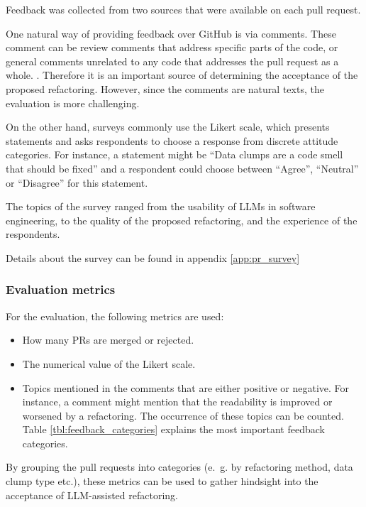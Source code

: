 Feedback was collected from two sources that were available on each pull request. 

One  natural way of providing feedback over GitHub is via comments. These comment can be review comments that address specific parts of the code, or general comments unrelated to any code that addresses the pull request as a whole. \cite{10.1145/3597208}. Therefore it is an important source of determining the acceptance of the proposed refactoring. However, since the comments are natural texts, the evaluation is more challenging.


On the other hand, surveys commonly use the Likert scale, which presents statements and asks respondents to choose a response from discrete attitude categories. \cite{HARPE2015836}
For instance, a statement might be \enquote{Data clumps are a code smell that should be fixed} and a respondent could choose between \enquote{Agree}, \enquote{Neutral} or \enquote{Disagree} for this statement. 


The topics of the survey  ranged from the usability of \acp{LLM} in software engineering, to the quality of the proposed refactoring, and the experience of the respondents. 


Details about the survey can be found in appendix \ref{app:pr_survey}


\subsubsection{Evaluation metrics}

For the evaluation, the following metrics are used:
\begin{itemize}

    \item  How many PRs are merged or rejected.
    \item The numerical value of the Likert scale.
    \item Topics mentioned in the comments that are either positive or negative. For instance, a comment might mention that the readability is improved or worsened by a refactoring. The occurrence of these topics can be counted.   Table \ref{tbl:feedback_categories} explains the most important feedback categories. 

\end{itemize}

By grouping the pull requests into categories (e.~g. by refactoring method, data clump type etc.), these metrics can be used to gather hindsight into the acceptance of \ac{LLM}-assisted refactoring. 

